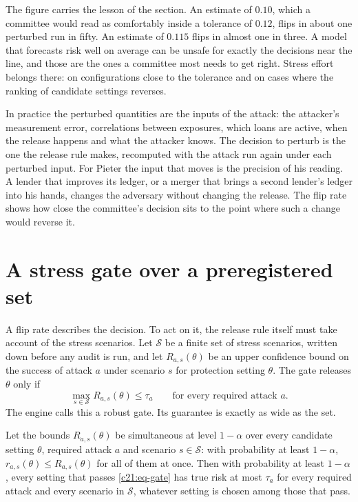 The figure carries the lesson of the section. An estimate of $0.10$, which a committee would read as
comfortably inside a tolerance of $0.12$, flips in about one perturbed run in fifty. An estimate of
$0.115$ flips in almost one in three. A model that forecasts risk well on average can be unsafe for
exactly the decisions near the line, and those are the ones a committee most needs to get right.
Stress effort belongs there: on configurations close to the tolerance and on cases where the ranking
of candidate settings reverses.

In practice the perturbed quantities are the inputs of the attack: the attacker's measurement
error, correlations between exposures, which loans are active, when the release happens and what
the attacker knows. The decision to perturb is the one the release rule makes, recomputed with the
attack run again under each perturbed input. For Pieter the input that moves is the precision of
his reading. A lender that improves its ledger, or a merger that brings a second lender's ledger
into his hands, changes the adversary without changing the release. The flip rate shows how close
the committee's decision sits to the point where such a change would reverse it.

\section{A stress gate over a preregistered set}

A flip rate describes the decision. To act on it, the release rule itself must take account of the
stress scenarios. Let $\mathcal S$ be a finite set of stress scenarios, written down before any audit is
run, and let $R_{a,s}(\theta)$ be an upper confidence bound on the success of attack $a$ under scenario $s$
for protection setting $\theta$. The gate releases $\theta$ only if
\begin{equation}\label{c21:eq-gate}
\max_{s\in\mathcal S}R_{a,s}(\theta)\le\tau_a\qquad\text{for every required attack }a.
\end{equation}
The engine calls this a robust gate. Its guarantee is exactly as wide as the set.

\begin{proposition}\label{c21:prop-gate}
Let the bounds $R_{a,s}(\theta)$ be simultaneous at level $1-\alpha$ over every candidate setting $\theta$,
required attack $a$ and scenario $s\in\mathcal S$: with probability at least $1-\alpha$,
$r_{a,s}(\theta)\le R_{a,s}(\theta)$ for all of them at once. Then with probability at least $1-\alpha$, every setting
that passes \eqref{c21:eq-gate} has true risk at most $\tau_a$ for every required attack and every scenario in $\mathcal S$,
whatever setting is chosen among those that pass.
\end{proposition}

